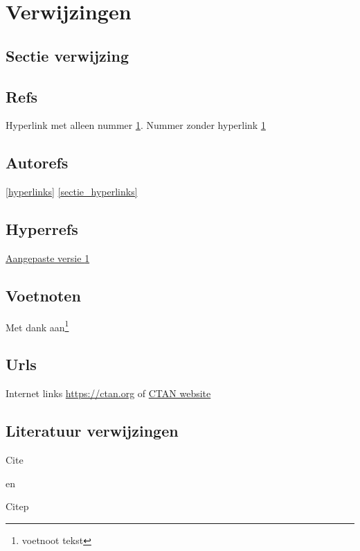 \chapter{Verwijzingen}
\label{hyperlinks}

\blindtext[7]

\label{page_hyperlinks}

\section{Sectie verwijzing}
\label{sectie_hyperlinks}

\blindtext[7]

\section{Refs}

Hyperlink met alleen nummer \ref{hyperlinks}.  
Nummer zonder hyperlink \ref*{hyperlinks}

\section{Autorefs}

\autoref{hyperlinks}
\autoref{sectie_hyperlinks}

\section{Hyperrefs}

\hyperref[hyperlinks]{Aangepaste versie \ref*{hyperlinks}}

\section{Voetnoten}

\blindtext

Met dank aan\footnote{voetnoot tekst}

\blindtext

\section{Urls}

Internet links \url{https://ctan.org}
of \href{https://ctan.org}{CTAN website}

\section{Literatuur verwijzingen}

Cite \cite{Martin2018}

en

Citep \citep{Martin2018}
